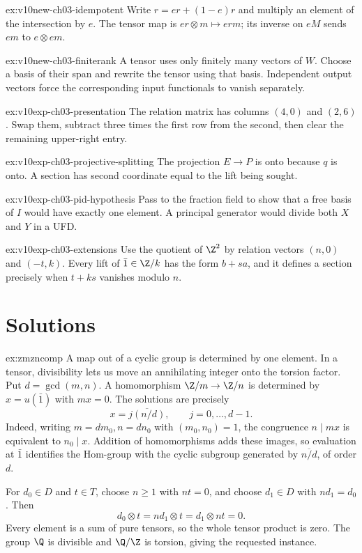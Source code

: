 \begin{hint}{ex:v10new-ch03-idempotent}
Write $r=er+(1-e)r$ and multiply an element of the intersection by $e$. The tensor map is $er\otimes m\mapsto erm$; its inverse on $eM$ sends $em$ to $e\otimes em$.
\end{hint}

\begin{hint}{ex:v10new-ch03-finiterank}
A tensor uses only finitely many vectors of $W$. Choose a basis of their span and rewrite the tensor using that basis. Independent output vectors force the corresponding input functionals to vanish separately.
\end{hint}


\begin{hint}{ex:v10exp-ch03-presentation}
The relation matrix has columns $(4,0)$ and $(2,6)$. Swap them, subtract three times the first row from the second, then clear the remaining upper-right entry.
\end{hint}
\begin{hint}{ex:v10exp-ch03-projective-splitting}
The projection $E\to P$ is onto because $q$ is onto. A section has second coordinate equal to the lift being sought.
\end{hint}
\begin{hint}{ex:v10exp-ch03-pid-hypothesis}
Pass to the fraction field to show that a free basis of $I$ would have exactly one element. A principal generator would divide both $X$ and $Y$ in a UFD.
\end{hint}
\begin{hint}{ex:v10exp-ch03-extensions}
Use the quotient of $\Z^2$ by relation vectors $(n,0)$ and $(-t,k)$. Every lift of $\bar1\in\Z/k$ has the form $b+sa$, and it defines a section precisely when $t+ks$ vanishes modulo $n$.
\end{hint}

\section{Solutions}

\begin{solution}{ex:zmzncomp}
\idea A map out of a cyclic group is determined by one element. In a tensor, divisibility lets us move an annihilating integer onto the torsion factor.
\writeup Put $d=\gcd(m,n)$. A homomorphism $\Z/m\to\Z/n$ is determined by $x=u(\bar1)$ with $mx=0$. The solutions are precisely
\[
x=\overline{j(n/d)},\qquad j=0,\ldots,d-1.
\]
Indeed, writing $m=dm_0,n=dn_0$ with $(m_0,n_0)=1$, the congruence $n\mid mx$ is equivalent to $n_0\mid x$. Addition of homomorphisms adds these images, so evaluation at $\bar1$ identifies the Hom-group with the cyclic subgroup generated by $\overline{n/d}$, of order $d$.

For $d_0\in D$ and $t\in T$, choose $n\ge1$ with $nt=0$, and choose $d_1\in D$ with $nd_1=d_0$. Then
\[
d_0\otimes t=nd_1\otimes t=d_1\otimes nt=0.
\]
Every element is a sum of pure tensors, so the whole tensor product is zero. The group $\Q$ is divisible and $\Q/\Z$ is torsion, giving the requested instance.
\end{solution}

